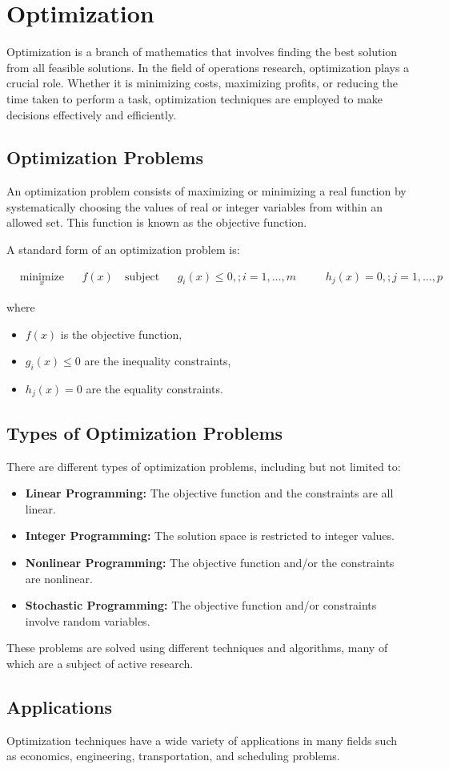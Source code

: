 \chapter{Optimization}

Optimization is a branch of mathematics that involves finding the best
solution from all feasible solutions. In the field of operations
research, optimization plays a crucial role. Whether it is minimizing
costs, maximizing profits, or reducing the time taken to perform a
task, optimization techniques are employed to make decisions
effectively and efficiently.

\section{Optimization Problems}

An optimization problem consists of maximizing or minimizing a real
function by systematically choosing the values of real or integer
variables from within an allowed set. This function is known as the
objective function.

A standard form of an optimization problem is:

\begin{equation*}
\begin{aligned}
& \underset{x}{\text{minimize}}
& & f(x) \
& \text{subject to}
& & g_i(x) \leq 0, ; i = 1, \ldots, m \
&
& & h_j(x) = 0, ; j = 1, \ldots, p
\end{aligned}
\end{equation*}

where
\begin{itemize}
\item $f(x)$ is the objective function,
\item $g_i(x) \leq 0$ are the inequality constraints,
\item $h_j(x) = 0$ are the equality constraints.
\end{itemize}

\section{Types of Optimization Problems}
There are different types of optimization problems, including but not limited to:

\begin{itemize}
\item \textbf{Linear Programming:} The objective function and the constraints are all linear.
\item \textbf{Integer Programming:} The solution space is restricted to integer values.
\item \textbf{Nonlinear Programming:} The objective function and/or the constraints are nonlinear.
\item \textbf{Stochastic Programming:} The objective function and/or constraints involve random variables.
\end{itemize}

These problems are solved using different techniques and algorithms,
many of which are a subject of active research.

\section{Applications}

Optimization techniques have a wide variety of applications in many
fields such as economics, engineering, transportation, and scheduling
problems.

